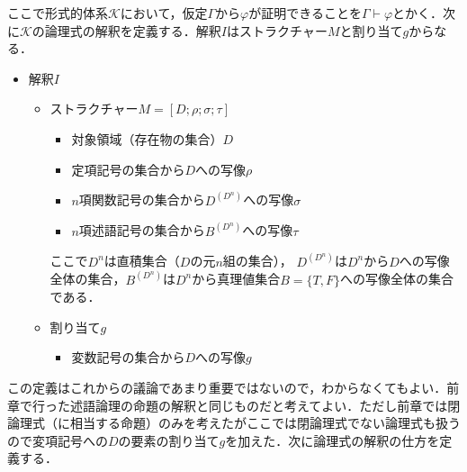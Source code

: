 \documentclass[10pt,b5paper,papersize,dvipdfmx]{jsbook}
\begin{document}
ここで形式的体系$\mathcal K$において，仮定$\Gamma$から$\varphi$が証明できることを$\Gamma \vdash \varphi$とかく．次に$\mathcal K$の論理式の解釈を定義する．解釈$I$はストラクチャー$M$と割り当て$g$からなる．
\begin{itemize}
\item 解釈$I$
\begin{itemize}
\item ストラクチャー$M=[D;\rho;\sigma;\tau]$
\begin{itemize}
\item 対象領域（存在物の集合）$D$
\item 定項記号の集合から$D$への写像$\rho$
\item $n$項関数記号の集合から$D^{(D^n)}$への写像$\sigma$
\item $n$項述語記号の集合から$B^{(D^n)}$への写像$\tau$
\end{itemize}
ここで$D^n$は直積集合（$D$の元$n$組の集合）， $D^{(D^n)}$は$D^n$から$D$への写像全体の集合，$B^{(D^n)}$は$D^n$から真理値集合$B=\{T,F\}$への写像全体の集合である．
\item 割り当て$g$
\begin{itemize}
\item 変数記号の集合から$D$への写像$g$
\end{itemize}
\end{itemize}
\end{itemize}
この定義はこれからの議論であまり重要ではないので，わからなくてもよい．前章で行った述語論理の命題の解釈と同じものだと考えてよい．ただし前章では閉論理式（に相当する命題）のみを考えたがここでは閉論理式でない論理式も扱うので変項記号への$D$の要素の割り当て$g$を加えた．次に論理式の解釈の仕方を定義する．
\end{document}
